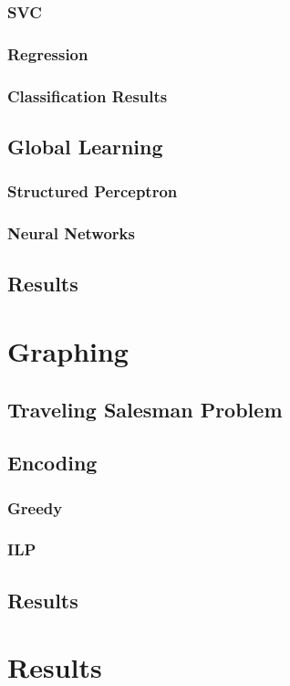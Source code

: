 \documentclass[bsc,frontabs,twoside,singlespacing,parskip,deptreport]{infthesis}     %
\begin{document}
\subsection{SVC}
\subsection{Regression}
\subsection{Classification Results}

\section{Global Learning}
\subsection{Structured Perceptron}
\subsection{Neural Networks}

\section{Results}

\chapter{Graphing}
\section{Traveling Salesman Problem}
\section{Encoding}
\subsection{Greedy}
\subsection{ILP}
\section{Results}

\chapter{Results}
\end{document}
